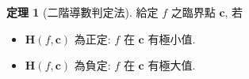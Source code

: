 \documentclass[12pt]{extarticle}
\newcommand{\ds}{\displaystyle}
\newcommand{\ifff}{\;\Longleftrightarrow\;}
\newcommand{\llt}{\left\langle}
\newcommand{\rgt}{\right\rangle}
\theoremstyle{definition}
\newtheorem*{thm}{定理}
\newtheorem*{ex}{例}
\newcommand{\vv}{\mathbf{v}}
\newcommand{\vc}{\mathbf{c}}
\newcommand{\vH}{\mathbf{H}}
\newcommand{\vA}{\mathbf{A}}
\begin{document}
%

\begin{thm}[二階導數判定法]
  給定 $f$ 之臨界點 $\vc$, 若
  \setlength{\columnsep}{10mm}
  \begin{multicols}{2}
    \begin{itemize}\setlength\itemsep{0em}
      \item $\vH(f, \vc)$ 為正定: $f$ 在 $\vc$ 有極小值. 
      \item $\vH(f, \vc)$ 為負定: $f$ 在 $\vc$ 有極大值. 
    \end{itemize}
  \end{multicols}
\end{thm}
\end{document}
